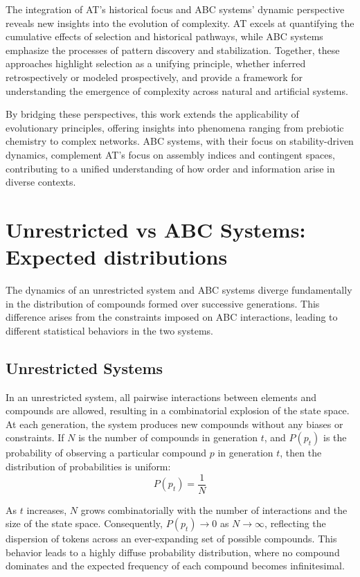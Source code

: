 \documentclass[entropy,article,submit,pdftex,oneauthor]{Definitions/mdpi}
\begin{document}
The integration of AT’s historical focus and ABC systems’ dynamic perspective reveals new insights into the evolution of complexity. AT excels at quantifying the cumulative effects of selection and historical pathways, while ABC systems emphasize the processes of pattern discovery and stabilization. Together, these approaches highlight selection as a unifying principle, whether inferred retrospectively or modeled prospectively, and provide a framework for understanding the emergence of complexity across natural and artificial systems.

By bridging these perspectives, this work extends the applicability of evolutionary principles, offering insights into phenomena ranging from prebiotic chemistry to complex networks. ABC systems, with their focus on stability-driven dynamics, complement AT’s focus on assembly indices and contingent spaces, contributing to a unified understanding of how order and information arise in diverse contexts.



\section{Unrestricted vs ABC Systems: Expected distributions}

The dynamics of an unrestricted system and ABC systems diverge fundamentally in the distribution of compounds formed over successive generations. This difference arises from the constraints imposed on ABC interactions, leading to different statistical behaviors in the two systems.

\subsection{Unrestricted Systems}

In an unrestricted system, all pairwise interactions between elements and compounds are allowed, resulting in a combinatorial explosion of the state space. At each generation, the system produces new compounds without any biases or constraints. If \( N \) is the number of compounds in generation \( t \), and \( P(p_t) \) is the probability of observing a particular compound \( p \) in generation \( t \), then the distribution of probabilities is uniform:
\begin{equation}
P(p_t) = \frac{1}{N}
\end{equation}

As \( t \) increases, \( N \) grows combinatorially with the number of interactions and the size of the state space. Consequently, \( P(p_t) \to 0 \) as \( N \to \infty \), reflecting the dispersion of tokens across an ever-expanding set of possible compounds. This behavior leads to a highly diffuse probability distribution, where no compound dominates and the expected frequency of each compound becomes infinitesimal.
\end{document}
